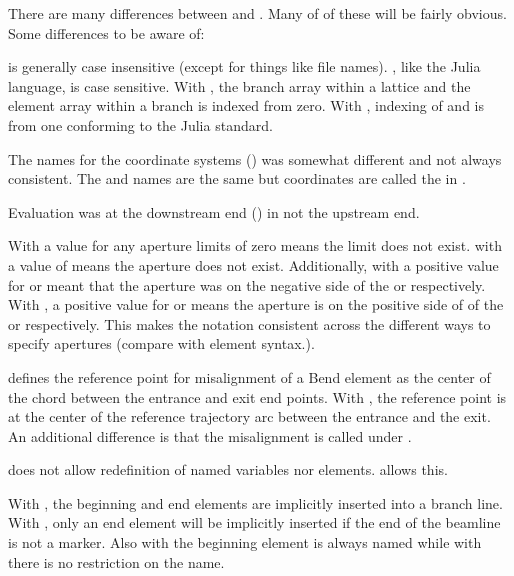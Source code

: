 There are many differences between \accellat and \bmad. Many of of these will be fairly
obvious. Some differences to be aware of:
\begin{description}
\item
\bmad is generally case insensitive (except for things like file names). \accellat, like
the Julia language, is case sensitive.
%
With \bmad, the branch array within a lattice and the element array within a branch is
indexed from zero. With \scibmad, indexing of  and  is 
from one conforming to the Julia standard.
%
\item
The \bmad names for the coordinate systems () was somewhat different and not
always consistent. The  and  names are the same but 
coordinates are called the  in \bmad.
%
\item
Evaluation was at the downstream end () in \bmad not the upstream end.
%
\item
With \bmad a value for any aperture limits of zero means the limit does not exist.
with \accellat a value of  means the aperture does not exist. Additionally, with
\bmad a positive value for  or  meant that the aperture was
on the negative side of the  or  respectively. With \accellat, a positive
value for  or  means the aperture is on the positive side of 
of the  or  respectively. This makes the notation consistent across 
the different ways to specify apertures (compare with  element syntax.).
%
\item
\accellat defines the reference point for misalignment of a Bend element as the center 
of the chord between the entrance and exit end points. 
With \bmad, the reference point is at the center of the reference trajectory arc between the entrance
and the exit. An additional difference is that the \bmad {} misalignment is called 
under \accellat.
%
\item
\bmad does not allow redefinition of named variables nor elements. \accellat allows this.
%
\item
With \bmad, the beginning and end elements are implicitly inserted into a branch line.
With \accellat, only an end element will be implicitly inserted if the end of the beamline is
not a marker. 
Also with \bmad the beginning element is always named  while with \accellat there
is no restriction on the name. 

\end{description}
